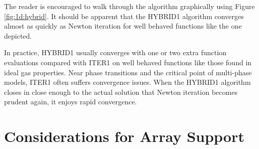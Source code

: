 \documentclass{article}
\begin{document}
The reader is encouraged to walk through the algorithm graphically using Figure \ref{fig:1d:hybrid}.  It should be apparent that the HYBRID1 algorithm converges almost as quickly as Newton iteration for well behaved functions like the one depicted.

In practice, HYBRID1 usually converges with one or two extra function evaluations compared with ITER1 on well behaved functions like those found in ideal gas properties.  Near phase transitions and the critical point of multi-phase models, ITER1 often suffers convergence issues.  When the HYBRID1 algorithm closes in close enough to the actual solution that Newton iteration becomes prudent again, it enjoys rapid convergence.

\section{Considerations for Array Support}
\end{document}
